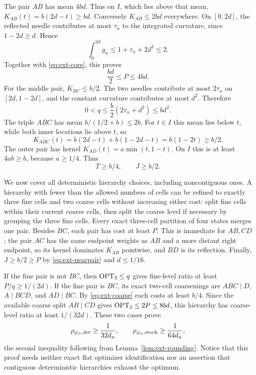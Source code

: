 The pair $AB$ has mean $4bd$. Thus on $I$, which lies above that mean,
$K_{AB}(t)=b(2d-t)\ge bd$. Conversely $K_{AB}\le2bd$ everywhere.
On $[0,2d]$, the reflected needle contributes at most $\tau_n$ to the
integrated curvature, since $1-2d\ge d$. Hence
\[
 \int_0^{2d}g_n\le1+\tau_n+2d^3\le2.
\]
Together with \eqref{eq:ext-core}, this proves
\begin{equation}
 \frac{bd}{2}\le P\le4bd.
 \label{eq:ext-nearpair}
\end{equation}
For the middle pair, $K_{BC}\le b/2$. The two needles contribute at most
$2\tau_n$ on $[2d,1-2d]$, and the constant curvature contributes at most
$d^2$. Therefore
\begin{equation}
 0<q\le\frac b2(2\tau_n+d^2)\le bd^2.
 \label{eq:ext-middlepair}
\end{equation}
The triple $ABC$ has mean $b/(1/2+b)\le2b$. For $t\in I$ this mean lies
below $t$, while both inner locations lie above $t$, so
\[
 K_{ABC}(t)=b(2d-t)+b(1-2d-t)=b(1-2t)\ge b/2.
\]
The outer pair has kernel $K_{AD}(t)=a\min(t,1-t)$. On $I$ this is at
least $4ab\ge b$, because $a\ge1/4$. Thus
\begin{equation}
 T\ge b/4,\qquad J\ge b/2.
 \label{eq:ext-coarse}
\end{equation}

We now cover all deterministic hierarchy choices, including noncontiguous
ones. A hierarchy with fewer than the allowed numbers of cells can be
refined to exactly three fine cells and two coarse cells without increasing
either cost: split fine cells within their current coarse cells, then split
the coarse level if necessary by grouping the three fine cells. Every exact
three-cell partition of four states merges one pair. Besides $BC$, each
pair has cost at least $P$. This is immediate for $AB,CD$; the pair $AC$
has the same endpoint weights as $AB$ and a more distant right endpoint,
so its kernel dominates $K_{AB}$ pointwise, and $BD$ is its reflection.
Finally, $J\ge b/2\ge P$ by \eqref{eq:ext-nearpair} and $d\le1/16$.

If the fine pair is not $BC$, then $\operatorname{OPT}_3\le q$ gives fine-level ratio
at least $P/q\ge1/(2d)$. If the fine pair is $BC$, its exact two-cell
coarsenings are $ABC\mid D$, $A\mid BCD$, and $AD\mid BC$. By
\eqref{eq:ext-coarse} each costs at least $b/4$. Since the available
coarse split $AB\mid CD$ gives $\operatorname{OPT}_2\le2P\le8bd$, this hierarchy has
coarse-level ratio at least $1/(32d)$. These two cases prove
\begin{equation}
 \rho_{\varphi_n,\mathrm{det}}\ge\frac1{32d_n},\qquad
 \rho_{\varphi_n,\mathrm{stoch}}\ge\frac1{64d_n},
 \label{eq:ext-lower}
\end{equation}
the second inequality following from Lemma~\ref{lem:ext-rounding}.
Notice that this proof needs neither exact flat optimizer identification nor
an assertion that contiguous deterministic hierarchies exhaust the optimum.

